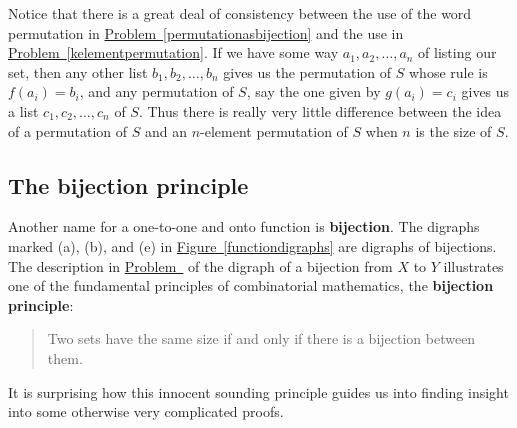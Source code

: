\documentclass[10pt,]{book}
\newcommand{\terminology}[1]{\textbf{#1}}
\theoremstyle{plain}
\theoremstyle{definition}
\numberwithin{equation}{chapter}
\begin{document}
Notice that there is a great deal of consistency between the use of the word permutation in \hyperref[permutationasbijection]{Problem~\ref{permutationasbijection}} and the use in \hyperref[kelementpermutation]{Problem~\ref{kelementpermutation}}. If we have some way \(a_1,a_2,\ldots,a_n\) of listing our set, then any other list \(b_1,b_2,\ldots,b_n\) gives us the permutation of \(S\) whose rule is \(f(a_i) =b_i\), and any permutation of \(S\), say the one given by \(g(a_i)=c_i\) gives us a list \(c_1,c_2,\ldots,c_n\) of \(S\). Thus there is really very little difference between the idea of a permutation of \(S\) and an \(n\)-element permutation of \(S\) when \(n\) is the size of \(S\).%
\typeout{************************************************}
\typeout{************************************************}
\subsection[{The bijection principle}]{The bijection principle}\label{subsection-3}
Another name for a one-to-one and onto function is \terminology{bijection}. The digraphs marked (a), (b), and (e) in \hyperref[functiondigraphs]{Figure~\ref{functiondigraphs}} are digraphs of bijections. The description in \hyperref[bijectiondigraph]{Problem~} of the digraph of a bijection from \(X\) to \(Y\) illustrates one of the fundamental principles of combinatorial mathematics, the \terminology{bijection principle}:%
\begin{quote}Two sets have the same size if and only if there is a bijection between them.%
\end{quote}
It is surprising how this innocent sounding principle guides us into finding insight into some otherwise very complicated proofs.%
\typeout{************************************************}
\typeout{************************************************}
\end{document}
